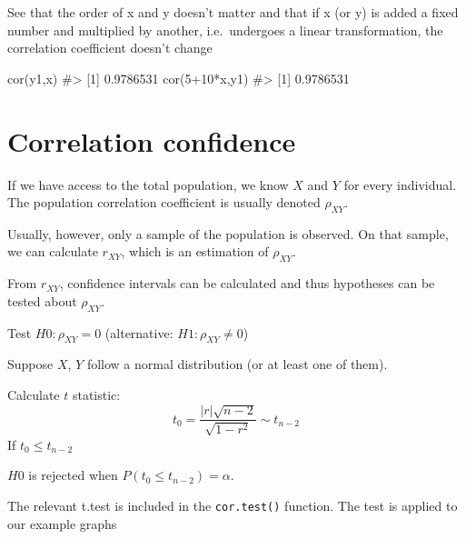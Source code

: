 \documentclass[
  letterpaper,
  DIV=11,
  numbers=noendperiod]{scrreprt}
\newenvironment{Shaded}{\begin{snugshade}}{\end{snugshade}}
\newcommand{\CommentTok}[1]{\textcolor[rgb]{0.37,0.37,0.37}{#1}}
\newcommand{\DecValTok}[1]{\textcolor[rgb]{0.68,0.00,0.00}{#1}}
\newcommand{\FunctionTok}[1]{\textcolor[rgb]{0.28,0.35,0.67}{#1}}
\newcommand{\NormalTok}[1]{\textcolor[rgb]{0.00,0.23,0.31}{#1}}
\newcommand{\SpecialCharTok}[1]{\textcolor[rgb]{0.37,0.37,0.37}{#1}}
\begin{document}
See that the order of x and y doesn't matter and that if x (or y) is
added a fixed number and multiplied by another, i.e.~undergoes a linear
transformation, the correlation coefficient doesn't change

\begin{Shaded}
\begin{Highlighting}[]
\FunctionTok{cor}\NormalTok{(y1,x)}
\CommentTok{\#\textgreater{} [1] 0.9786531}
\FunctionTok{cor}\NormalTok{(}\DecValTok{5}\SpecialCharTok{+}\DecValTok{10}\SpecialCharTok{*}\NormalTok{x,y1)}
\CommentTok{\#\textgreater{} [1] 0.9786531}
\end{Highlighting}
\end{Shaded}

\section{Correlation confidence}\label{correlation-confidence}

If we have access to the total population, we know \(X\) and \(Y\) for
every individual. The population correlation coefficient is usually
denoted \(\rho_{XY}\).

Usually, however, only a sample of the population is observed. On that
sample, we can calculate \(r_{XY}\), which is an estimation of
\(\rho_{XY}\).

From \(r_{XY}\), confidence intervals can be calculated and thus
hypotheses can be tested about \(\rho_{XY}\).

Test \(H0: \rho_{XY} = 0\) (alternative: \(H1: \rho_{XY} \ne0\))

Suppose \(X\), \(Y\) follow a normal distribution (or at least one of
them).

Calculate \(t\) statistic:
\[t_0 = \dfrac {|r|\sqrt{n-2}}{\sqrt{1-r^2}} \sim t_{n-2}\] If
\(t_0 \le t_{n-2}\)

\(H0\) is rejected when \(P(t_0 \le t_{n-2}) = \alpha\).

The relevant t.test is included in the \texttt{cor.test()} function. The
test is applied to our example graphs
\end{document}
